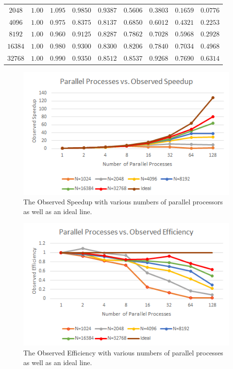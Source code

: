 \documentclass[11pt]{article}
\begin{document}
\begin{table}
{\begin{tabular}{ |c|c|c|c|c|c|c|c|c|  }
$2048  $&$ 1.00  $&$ 1.095  $&$ 0.9850  $&$ 0.9387  $&$ 0.5606  $&$ 0.3803 $&$ 0.1659 $&$ 0.0776  $\\
$4096  $&$ 1.00  $&$ 0.975  $&$ 0.8375  $&$ 0.8137  $&$ 0.6850 $&$ 0.6012 $&$ 0.4321 $&$ 0.2253 $\\
$8192  $&$ 1.00  $&$ 0.960  $&$ 0.9125  $&$ 0.8287  $&$ 0.7862 $&$ 0.7028 $&$ 0.5968 $&$ 0.2928 $\\
$16384 $&$ 1.00  $&$ 0.980  $&$ 0.9300  $&$ 0.8300  $&$ 0.8206 $&$ 0.7840 $&$ 0.7034 $&$ 0.4968 $\\
$32768 $&$ 1.00  $&$ 0.990  $&$ 0.9350  $&$ 0.8512  $&$ 0.8537 $&$ 0.9268 $&$ 0.7690 $&$ 0.6314 $\\
\hline
\hline
\end{tabular}
}
\end{table}
\begin{figure}
\caption{The Observed Speedup with various numbers of parallel processors as well as an ideal line.}
\includegraphics{speedup.png}
\end{figure}
\begin{figure}
\caption{The Observed Efficiency with various numbers of parallel processes as well as an ideal line.}
\includegraphics{efficiency.png}
\end{figure}
\end{document}
